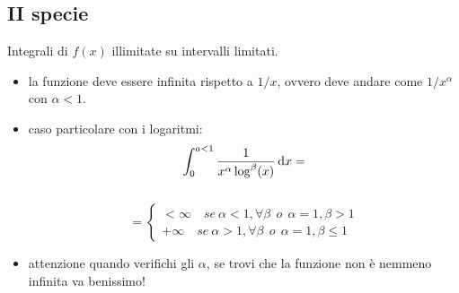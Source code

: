 \documentclass[a4paper,portrait,columns=3,5pt]{cheatsheet}
\begin{document}
\subsection{II specie}
Integrali di $f(x)$ illimitate su intervalli limitati. 
\begin{itemize}
    \item la funzione deve essere infinita rispetto a $1/x$, ovvero deve andare come $1/x^{\alpha}$ con $\alpha < 1$.
    \item caso particolare con i logaritmi:
    $$ \int_0^{a<1} \frac{1}{x^\alpha \log^\beta (x)} \dif x  =$$ \\$$ = 
    \begin{cases*}
        < \infty \quad se~\alpha < 1, \forall \beta ~~ o ~~ \alpha = 1, \beta > 1 \\
        + \infty \quad se~\alpha > 1, \forall \beta ~~ o ~~ \alpha = 1, \beta \leq 1
    \end{cases*}$$
    \item attenzione quando verifichi gli $\alpha$, se trovi che la funzione non è nemmeno infinita va benissimo!
\end{itemize}
\end{document}
